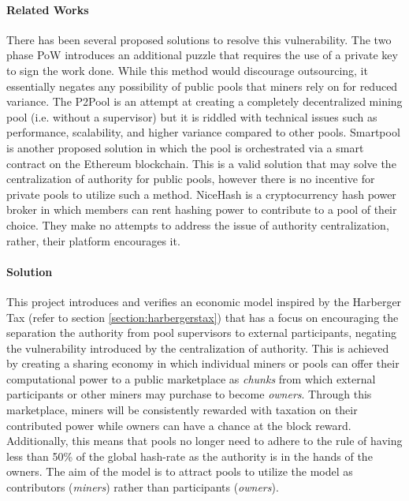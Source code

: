 \paragraph{Related Works} There has been several proposed solutions to resolve this vulnerability. The two phase PoW \cite{bastiaan2015} introduces an additional puzzle that requires the use of a private key to sign the work done. While this method would discourage outsourcing, it essentially negates any possibility of public pools that miners rely on for reduced variance. The P2Pool is an attempt at creating a completely decentralized mining pool (i.e. without a supervisor) but it is riddled with technical issues such as performance, scalability, and higher variance compared to other pools. Smartpool \cite{smartpool2017} is another proposed solution in which the pool is orchestrated via a smart contract on the Ethereum blockchain. This is a valid solution that may solve the centralization of authority for public pools, however there is no incentive for private pools to utilize such a method. NiceHash is a cryptocurrency hash power broker in which members can rent hashing power to contribute to a pool of their choice. They make no attempts to address the issue of authority centralization, rather, their platform encourages it.

\paragraph{Solution} This project introduces and verifies an economic model inspired by the Harberger Tax \cite{posnerweyl2017} (refer to section \ref{section:harbergerstax}) that has a focus on encouraging the separation the authority from pool supervisors to external participants, negating the vulnerability introduced by the centralization of authority. This is achieved by creating a sharing economy in which individual miners or pools can offer their computational power to a public marketplace as \textit{chunks} from which external participants or other miners may purchase to become \textit{owners}. Through this marketplace, miners will be consistently rewarded with taxation on their contributed power while owners can have a chance at the block reward. Additionally, this means that pools no longer need to adhere to the rule of having less than 50\% of the global hash-rate as the authority is in the hands of the owners. The aim of the model is to attract pools to utilize the model as contributors (\textit{miners}) rather than participants (\textit{owners}). 
